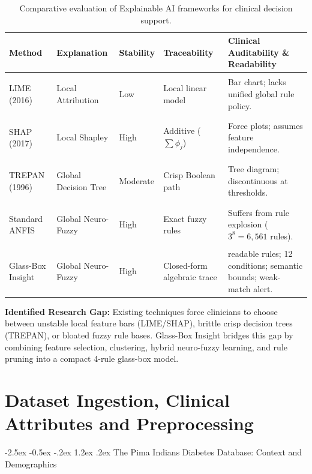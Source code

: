 \documentclass[12pt,a4paper,oneside]{report}
\makeatletter
\renewcommand\section{\@startsection {section}{1}{\z@}%
                                   {-2.5ex \@plus -0.5ex \@minus -.2ex}%
                                   {1.2ex \@plus .2ex}%
                                   {\normalfont\fontsize{13}{16}\selectfont\bfseries}}
\makeatother
\begin{document}
\begin{table}[htbp]
\centering
\footnotesize
\renewcommand{\arraystretch}{0.80}
\setlength{\tabcolsep}{2.5pt}
\begin{tabularx}{\textwidth}{>{\bfseries\raggedright\arraybackslash}p{2.0cm} >{\raggedright\arraybackslash}p{1.9cm} >{\raggedright\arraybackslash}p{1.4cm} >{\raggedright\arraybackslash}p{2.1cm} >{\raggedright\arraybackslash}X}
\toprule
\textbf{Method} & \textbf{Explanation} & \textbf{Stability} & \textbf{Traceability} & \textbf{Clinical Auditability \& Readability} \\
\midrule
LIME (2016) & Local Attribution & Low & Local linear model & Bar chart; lacks unified global rule policy. \\
\midrule
SHAP (2017) & Local Shapley & High & Additive ($\sum \phi_j$) & Force plots; assumes feature independence. \\
\midrule
TREPAN (1996) & Global Decision Tree & Moderate & Crisp Boolean path & Tree diagram; discontinuous at thresholds. \\
\midrule
Standard ANFIS & Global Neuro-Fuzzy & High & Exact fuzzy rules & Suffers from rule explosion ($3^8 = 6{,}561$ rules). \\
\midrule
Glass-Box Insight & Global Neuro-Fuzzy & High & Closed-form algebraic trace & 4 readable rules; 12 conditions; semantic bounds; weak-match alert. \\
\bottomrule
\end{tabularx}
\caption[Comparative Evaluation of Explainable AI Frameworks]{Comparative evaluation of Explainable AI frameworks for clinical decision support.}
\label{tab:literature_comparison}
\end{table}

\textbf{Identified Research Gap:} Existing techniques force clinicians to choose between unstable local feature bars (LIME/SHAP), brittle crisp decision trees (TREPAN), or bloated fuzzy rule bases. Glass-Box Insight bridges this gap by combining feature selection, clustering, hybrid neuro-fuzzy learning, and rule pruning into a compact 4-rule glass-box model.


\chapter{Dataset Ingestion, Clinical Attributes and Preprocessing}

\section{The Pima Indians Diabetes Database: Context and Demographics}
\end{document}

